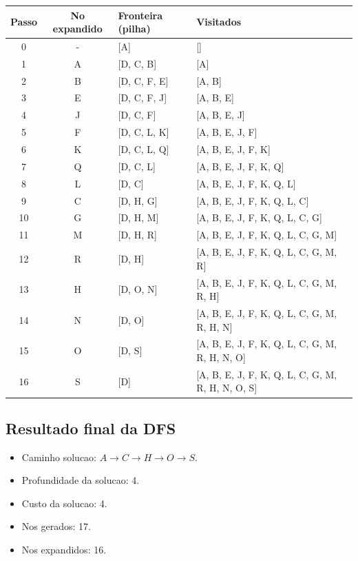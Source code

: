 \begingroup
\footnotesize
\setlength{\tabcolsep}{4pt}
\renewcommand{\arraystretch}{1.15}
\begin{longtable}{c c p{4.9cm} p{5.9cm}}
\toprule
Passo & No expandido & Fronteira (pilha) & Visitados \\
\midrule
0 & - & [A] & [] \\
1 & A & [D, C, B] & [A] \\
2 & B & [D, C, F, E] & [A, B] \\
3 & E & [D, C, F, J] & [A, B, E] \\
4 & J & [D, C, F] & [A, B, E, J] \\
5 & F & [D, C, L, K] & [A, B, E, J, F] \\
6 & K & [D, C, L, Q] & [A, B, E, J, F, K] \\
7 & Q & [D, C, L] & [A, B, E, J, F, K, Q] \\
8 & L & [D, C] & [A, B, E, J, F, K, Q, L] \\
9 & C & [D, H, G] & [A, B, E, J, F, K, Q, L, C] \\
10 & G & [D, H, M] & [A, B, E, J, F, K, Q, L, C, G] \\
11 & M & [D, H, R] & [A, B, E, J, F, K, Q, L, C, G, M] \\
12 & R & [D, H] & [A, B, E, J, F, K, Q, L, C, G, M, R] \\
13 & H & [D, O, N] & [A, B, E, J, F, K, Q, L, C, G, M, R, H] \\
14 & N & [D, O] & [A, B, E, J, F, K, Q, L, C, G, M, R, H, N] \\
15 & O & [D, S] & [A, B, E, J, F, K, Q, L, C, G, M, R, H, N, O] \\
16 & S & [D] & [A, B, E, J, F, K, Q, L, C, G, M, R, H, N, O, S] \\
\bottomrule
\end{longtable}
\endgroup

\subsection{Resultado final da DFS}
\begin{itemize}[leftmargin=1.5em]
  \item Caminho solucao: $A \rightarrow C \rightarrow H \rightarrow O \rightarrow S$.
  \item Profundidade da solucao: 4.
  \item Custo da solucao: 4.
  \item Nos gerados: 17.
  \item Nos expandidos: 16.
\end{itemize}

